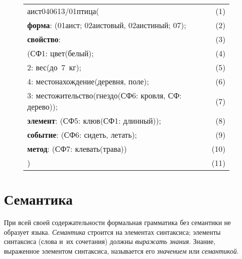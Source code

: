 \begin{multicols}{2}
     \begin{figure*}[b] %
     \begin{center}
     \begin{tabular}{lr}
  {аист040613/01птица}(      &       (1)\\
  {\textbf{форма}}: (01аист; 02{аистовый}, 02{аистиный}; 07); 
&   (2)\\
  {\textbf{свойство}}: &                        (3)\\
  \hspace*{5mm}({СФ}1: {цвет}({белый}); &          
    (4)\\
  \hspace*{5mm}{СФ}2: {вес}({до}~7~кг); &          
    (5)\\
  \hspace*{5mm}{СФ}4: {местонахождение}({деревня}, 
{поле}); &   (6)\\
  \hspace*{5mm}{СФ}3: 
{местожительство}({гнездо}({СФ}6: {кровля}, {СФ}: 
{дерево})); &(7)\\
  {\textbf{элемент}}: ({СФ}5: {клюв}({СФ}1: {длинный})); &
    (8)\\
  {\textbf{событие}}: ({СФ}6: {сидеть}, {летать}); &  (9)\\
  {\textbf{метод}}: ({СФ}7: {клевать}({трава})) & (10)\\
  )  &          (11)
  \end{tabular}
\end{center}
\end{figure*}




\section{Семантика}


     При всей своей содержательности формальная грамматика без 
семантики не образует языка. \textit{Семантика} строится на элементах 
синтаксиса; элементы синтаксиса (слова и~их сочетания) должны 
\textit{выражать знания}. Знание, выраженное элементом синтаксиса, 
называется его \textit{значением} или \textit{семантикой}. 
     

\end{multicols}
